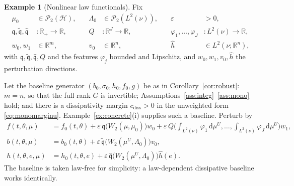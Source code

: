 \documentclass[preprint,12pt]{elsarticle}
\newcommand{\R}{\mathbb{R}}
\newcommand{\diff}{\mathrm{d}}
\newcommand{\Lnu}{L^2(\nu)}
\numberwithin{equation}{section}
\theoremstyle{plain}
\theoremstyle{definition}
\theoremstyle{\PaperRemarkStyle}
\newtheorem{example}[theorem]{Example}
\begin{document}
\begin{example}[Nonlinear law functionals]\label{ex:fulllaw}
Fix
\[
\begin{aligned}
\mu_0&\in\mathcal P_2(\mathcal H), &\quad \Lambda_0&\in\mathcal P_2(\Lnu),
&\quad \varepsilon&>0,\\
\mathfrak q,\tilde{\mathfrak q},\hat{\mathfrak q}&:\R_+\to\R, &\quad Q&:\R^J\to\R,
&\quad \varphi_1,\dots,\varphi_J&:\Lnu\to\R,\\
w_0,w_1&\in\R^m, &\quad v_0&\in\R^n, &\quad \hat h&\in L^2(\nu;\R^n),
\end{aligned}
\]
with $\mathfrak q,\tilde{\mathfrak q},\hat{\mathfrak q},Q$ and the features $\varphi_j$ bounded and Lipschitz, and
$w_0,w_1,v_0,\hat h$ the perturbation directions.

Let the baseline generator $(b_0,\sigma_0,h_0,f_0,g)$ be as in Corollary~\ref{cor:robust}:
$m=n$, so that the full-rank $G$ is invertible; Assumptions~\ref{ass:integ}--\ref{ass:mono}
hold; and there is a dissipativity margin $c_{\mathrm{diss}}>0$ in the unweighted form
\eqref{eq:monomarginu}. Example~\ref{ex:concrete}(i) supplies such a baseline. Perturb by
\begin{align*}
f(t,\theta,\mu)&=f_0(t,\theta)+\varepsilon\,\mathfrak q\bigl(W_2(\mu,\mu_0)\bigr)w_0
+\varepsilon\,Q\biggl(\int_{\Lnu}\varphi_1\,\diff\mu^U,\dots,\int_{\Lnu}\varphi_J\,\diff\mu^U\biggr)w_1,\\
b(t,\theta,\mu)&=b_0(t,\theta)+\varepsilon\,\tilde{\mathfrak q}\bigl(W_2(\mu^U,\Lambda_0)\bigr)v_0,\\
h(t,\theta,e,\mu)&=h_0(t,\theta,e)+\varepsilon\,\hat{\mathfrak q}\bigl(W_2(\mu^U,\Lambda_0)\bigr)\hat h(e) .
\end{align*}
The baseline is taken law-free for simplicity: a law-dependent dissipative baseline
works identically.


\end{example}
\end{document}
